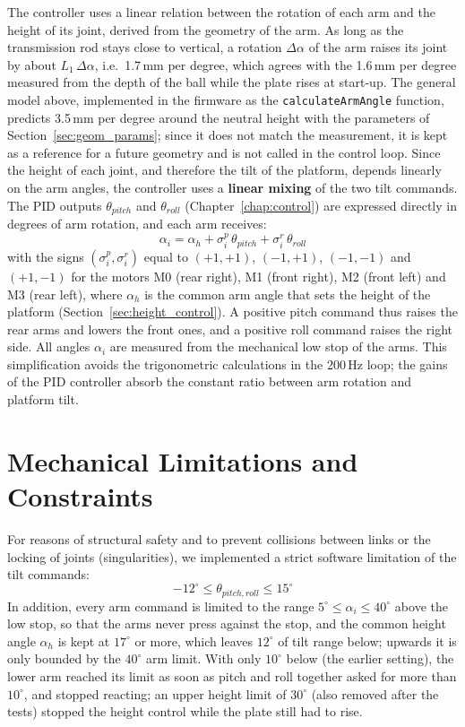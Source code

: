 \documentclass[12pt,a4paper]{report}
\begin{document}
The controller uses a linear relation between the rotation of each arm and the height of its joint, derived from the geometry of the arm. As long as the transmission rod stays close to vertical, a rotation $\Delta\alpha$ of the arm raises its joint by about $L_1\,\Delta\alpha$, i.e.\ 1.7\,mm per degree, which agrees with the 1.6\,mm per degree measured from the depth of the ball while the plate rises at start-up. The general model above, implemented in the firmware as the \texttt{calculateArmAngle} function, predicts 3.5\,mm per degree around the neutral height with the parameters of Section~\ref{sec:geom_params}; since it does not match the measurement, it is kept as a reference for a future geometry and is not called in the control loop. Since the height of each joint, and therefore the tilt of the platform, depends linearly on the arm angles, the controller uses a \textbf{linear mixing} of the two tilt commands. The PID outputs $\theta_{pitch}$ and $\theta_{roll}$ (Chapter~\ref{chap:control}) are expressed directly in degrees of arm rotation, and each arm receives:
\begin{equation}
    \alpha_i = \alpha_h + \sigma_i^{p}\,\theta_{pitch} + \sigma_i^{r}\,\theta_{roll}
\end{equation}
with the signs $(\sigma_i^{p}, \sigma_i^{r})$ equal to $(+1,+1)$, $(-1,+1)$, $(-1,-1)$ and $(+1,-1)$ for the motors M0 (rear right), M1 (front right), M2 (front left) and M3 (rear left), where $\alpha_h$ is the common arm angle that sets the height of the platform (Section~\ref{sec:height_control}). A positive pitch command thus raises the rear arms and lowers the front ones, and a positive roll command raises the right side. All angles $\alpha_i$ are measured from the mechanical low stop of the arms. This simplification avoids the trigonometric calculations in the 200\,Hz loop; the gains of the PID controller absorb the constant ratio between arm rotation and platform tilt.

\section{Mechanical Limitations and Constraints}
For reasons of structural safety and to prevent collisions between links or the locking of joints (singularities), we implemented a strict software limitation of the tilt commands:
\begin{equation}
    -12^\circ \leq \theta_{pitch, roll} \leq 15^\circ
\end{equation}
In addition, every arm command is limited to the range $5^\circ \leq \alpha_i \leq 40^\circ$ above the low stop, so that the arms never press against the stop, and the common height angle $\alpha_h$ is kept at $17^\circ$ or more, which leaves $12^\circ$ of tilt range below; upwards it is only bounded by the $40^\circ$ arm limit. With only $10^\circ$ below (the earlier setting), the lower arm reached its limit as soon as pitch and roll together asked for more than $10^\circ$, and stopped reacting; an upper height limit of $30^\circ$ (also removed after the tests) stopped the height control while the plate still had to rise.
\end{document}
